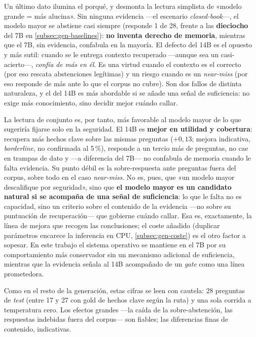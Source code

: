 Un último dato ilumina el porqué, y desmonta la lectura simplista de «modelo grande = más alucina». Sin ninguna evidencia —el escenario \emph{closed-book}—, el modelo mayor se abstiene casi siempre (responde 1 de 28, frente a las \textbf{dieciocho} del 7B en \ref{subsec:gen-baselines}): \textbf{no inventa derecho de memoria}, mientras que el 7B, sin evidencia, confabula en la mayoría. El defecto del 14B es el opuesto y más sutil: cuando se le entrega contexto recuperado —aunque sea un casi-acierto—, \emph{confía de más en él}. Es una virtud cuando el contexto es el correcto (por eso rescata abstenciones legítimas) y un riesgo cuando es un \emph{near-miss} (por eso responde de más ante lo que el corpus no cubre). Son dos fallos de distinta naturaleza, y el del 14B es más abordable si se añade una señal de suficiencia: no exige más conocimiento, sino decidir mejor cuándo callar.

La lectura de conjunto es, por tanto, más favorable al modelo mayor de lo que sugeriría fijarse solo en la seguridad. El 14B es \textbf{mejor en utilidad y cobertura}: recupera más hechos clave sobre las mismas preguntas ($+0{,}13$; mejora indicativa, \emph{borderline}, no confirmada al 5\,\%), responde a un tercio más de preguntas, no cae en trampas de dato y —a diferencia del 7B— no confabula de memoria cuando le falta evidencia. Su punto débil es la sobre-respuesta ante preguntas fuera del corpus, sobre todo en el caso \emph{near-miss}. No es, pues, que «un modelo mayor descalifique por seguridad», sino que \textbf{el modelo mayor es un candidato natural si se acompaña de una señal de suficiencia}: lo que le falta no es capacidad, sino un criterio sobre el contenido de la evidencia —no sobre su puntuación de recuperación— que gobierne cuándo callar. Esa es, exactamente, la línea de mejora que recogen las conclusiones; el coste añadido (duplicar parámetros encarece la inferencia en CPU, \ref{subsec:gen-coste}) es el otro factor a sopesar. En este trabajo el sistema operativo se mantiene en el 7B por su comportamiento más conservador sin un mecanismo adicional de suficiencia, mientras que la evidencia señala al 14B acompañado de un \emph{gate} como una línea prometedora.

Como en el resto de la generación, estas cifras se leen con cautela: 28 preguntas de \emph{test} (entre 17 y 27 con gold de hechos clave según la ruta) y una sola corrida a temperatura cero. Los efectos grandes —la caída de la sobre-abstención, las respuestas indebidas fuera del corpus— son fiables; las diferencias finas de contenido, indicativas.

